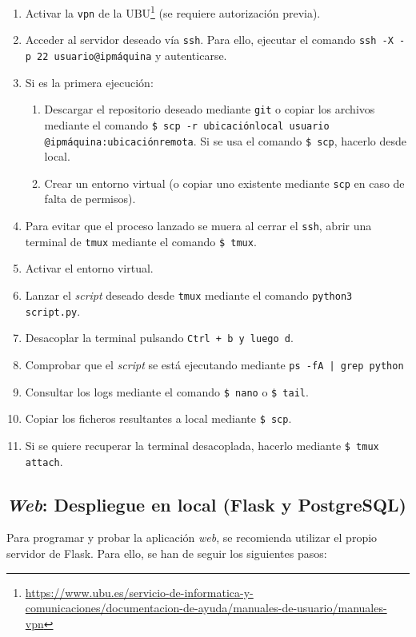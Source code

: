 \begin{enumerate}
	\item Activar la \texttt{vpn} de la UBU\footnote{\url{https://www.ubu.es/servicio-de-informatica-y-comunicaciones/documentacion-de-ayuda/manuales-de-usuario/manuales-vpn}} (se requiere autorización previa).
	\item Acceder al servidor deseado vía \texttt{ssh}. Para ello, ejecutar el comando \texttt{ssh -X -p 22 usuario@ipmáquina} y autenticarse.
	\item Si es la primera ejecución:
		\begin{enumerate}
			\item Descargar el repositorio deseado mediante \texttt{git} o copiar los archivos mediante el comando \texttt{\$ scp -r ubicaciónlocal usuario} \texttt{@ipmáquina:ubicaciónremota}. Si se usa el comando \texttt{\$ scp}, hacerlo desde local.
			\item Crear un entorno virtual (o copiar uno existente mediante \texttt{scp} en caso de falta de permisos).
		\end{enumerate}
	\item Para evitar que el proceso lanzado se muera al cerrar el \texttt{ssh}, abrir una terminal de \texttt{tmux} mediante el comando \texttt{\$ tmux}.
	\item Activar el entorno virtual.
	\item Lanzar el \textit{script} deseado desde \texttt{tmux} mediante el comando \texttt{python3 script.py}.
	\item Desacoplar la terminal pulsando \texttt{Ctrl + b y luego d}.
	\item Comprobar que el \textit{script} se está ejecutando mediante \texttt{ps -fA | grep python}
	\item Consultar los logs mediante el comando \texttt{\$ nano} o \texttt{\$ tail}.
	\item Copiar los ficheros resultantes a local mediante \texttt{\$ scp}.
	\item Si se quiere recuperar la terminal desacoplada, hacerlo mediante \texttt{\$ tmux attach}.
\end{enumerate}

\subsection{\textit{Web}: Despliegue en local (Flask y PostgreSQL)}
\label{s-d:flask-deploy}
Para programar y probar la aplicación \textit{web}, se recomienda utilizar el propio servidor de Flask. Para ello, se han de seguir los siguientes pasos:


